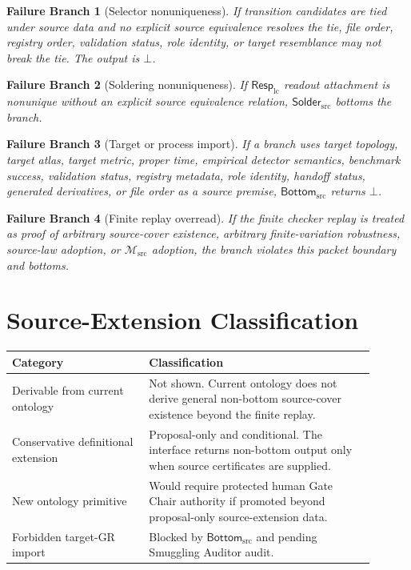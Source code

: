 \documentclass[11pt]{article}
\newcommand{\RespLC}{\mathsf{Resp}_{\mathrm{lc}}}
\newcommand{\Msrc}{\mathcal{M}_{\mathrm{src}}}
\newcommand{\BottomSrc}{\mathsf{Bottom}_{\mathrm{src}}}
\newcommand{\SolderSrc}{\mathsf{Solder}_{\mathrm{src}}}
\newcommand{\Bot}{\bot}
\newtheorem{branch}{Failure Branch}
\begin{document}
\begin{branch}[Selector nonuniqueness]
If transition candidates are tied under source data and no explicit source
equivalence resolves the tie, file order, registry order, validation status,
role identity, or target resemblance may not break the tie. The output is
\(\Bot\).
\end{branch}

\begin{branch}[Soldering nonuniqueness]
If \(\RespLC\) readout attachment is nonunique without an explicit source
equivalence relation, \(\SolderSrc\) bottoms the branch.
\end{branch}

\begin{branch}[Target or process import]
If a branch uses target topology, target atlas, target metric, proper time,
empirical detector semantics, benchmark success, validation status, registry
metadata, role identity, handoff status, generated derivatives, or file
order as a source premise, \(\BottomSrc\) returns \(\Bot\).
\end{branch}

\begin{branch}[Finite replay overread]
If the finite checker replay is treated as proof of arbitrary source-cover
existence, arbitrary finite-variation robustness, source-law adoption, or
\(\Msrc\) adoption, the branch violates this packet boundary and bottoms.
\end{branch}

\section{Source-Extension Classification}

\begin{center}
\begin{tabular}{p{0.34\linewidth}p{0.56\linewidth}}
\hline
Category & Classification \\
\hline
Derivable from current ontology & Not shown. Current ontology does not derive
general non-bottom source-cover existence beyond the finite replay. \\
Conservative definitional extension & Proposal-only and conditional. The
interface returns non-bottom output only when source certificates are supplied. \\
New ontology primitive & Would require protected human Gate Chair authority
if promoted beyond proposal-only source-extension data. \\
Forbidden target-GR import & Blocked by \(\BottomSrc\) and pending Smuggling
Auditor audit. \\
\hline
\end{tabular}
\end{center}
\end{document}
